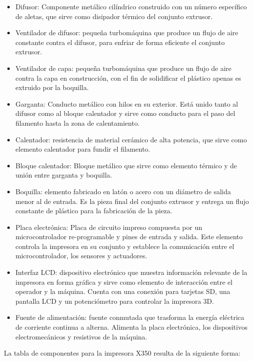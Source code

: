 \begin{itemize}
\item Difusor: Componente metálico cilíndrico construido con un número específico de aletas, que sirve como disipador térmico del conjunto extrusor.
\item Ventilador de difusor: pequeña turbomáquina que produce un flujo de aire constante contra el difusor, para enfriar de forma eficiente el conjunto extrusor.
\item Ventilador de capa: pequeña turbomáquina que produce un flujo de aire contra la capa en construcción, con el fin de solidificar el plástico apenas es extruido por la boquilla.
\item Garganta: Conducto metálico con hilos en su exterior. Está unido tanto al difusor como al bloque calentador y sirve como conducto para el paso del filamento hasta la zona de calentamiento.
\item Calentador: resistencia de material cerámico de alta potencia, que sirve como elemento calentador para fundir el filamento.
\item Bloque calentador: Bloque metálico que sirve como elemento térmico y de unión entre garganta y boquilla.
\item Boquilla: elemento fabricado en latón o acero con un diámetro de salida menor al de entrada. Es la pieza final del conjunto extrusor y entrega un flujo constante de plástico para la fabricación de la pieza.
\item Placa electrónica: Placa de circuito impreso compuesta por un microcontrolador re-programable y pines de entrada y salida. Este elemento controla la impresora en su conjunto y establece la comunicación entre el microcontrolador, los sensores y actuadores.
\item Interfaz LCD: dispositivo electrónico que muestra información relevante de la impresora en forma gráfica y sirve como elemento de interacción entre el operador y la máquina. Cuenta con una conexión para tarjetas SD, una pantalla LCD y un potenciómetro para controlar la impresora 3D. 
\item Fuente de alimentación: fuente conmutada que trasforma la energía eléctrica de corriente continua a alterna. Alimenta la placa electrónica, los dispositivos electromecánicos y resistivos de la máquina. 
\end{itemize}

La tabla de componentes para la impresora X350 resulta de la siguiente forma:

